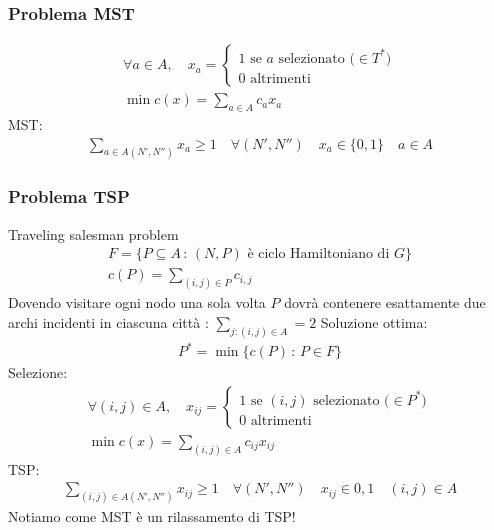 \documentclass[a4paper,12pt]{article}
\begin{document}
\subsubsection{Problema MST}
\begin{align*}
  \forall a \in A, \quad x_a = \begin{cases}
  1 \text{ se $a$ selezionato ($\in T^*$)}\\
  0 \text{ altrimenti}
  \end{cases}\\
  \min c(x) = \sum_{a \in A} c_a x_a
\end{align*}
MST:
\begin{align*}
  \sum_{a \in A(N', N'')} x_a \geq 1 \quad \forall (N', N'') \quad x_a \in \{0,1\} \quad a \in A
\end{align*}
\subsubsection{Problema TSP}
Traveling salesman problem
\begin{align*}
  F = \{P \subseteq A \, : \,(N,P) \text{ è ciclo Hamiltoniano di $G$}\}\\
  c(P) = \sum_{(i,j) \in P} c_{i,j}
\end{align*}
Dovendo visitare ogni nodo una sola volta $P$ dovrà contenere esattamente due archi incidenti in ciascuna città : $\sum_{j:(i,j) \in A} = 2$
Soluzione ottima:
\begin{align*}
  P^* = \min\{c(P) \, : \, P \in F\}
\end{align*}
Selezione:
\begin{align*}
\forall (i,j) \in A, \quad x_{ij} = \begin{cases}
  1 \text{ se $(i,j)$ selezionato ($\in P^*$)}\\
  0 \text{ altrimenti}
\end{cases}\\
\min c(x) = \sum_{(i,j) \in A} c_{ij}x_{ij}
\end{align*}
TSP:
\begin{align*}
  \sum_{(i,j) \in A(N', N'')} x_{ij} \geq 1 \quad \forall (N',N'') \quad x_{ij} \in {0,1} \quad (i,j) \in A
\end{align*}
Notiamo come MST è un rilassamento di TSP!
\end{document}
